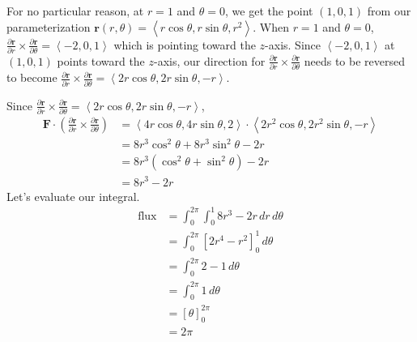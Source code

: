 \documentclass{article}
\newcommand{\lrp}[1]{\left( #1 \right)}
\newcommand{\lra}[1]{\left\langle #1 \right\rangle}
\newcommand{\lrb}[1]{\left[ #1 \right]}
\renewcommand{\r}[0]{\mathbf{r}}
\newcommand{\F}[0]{\mathbf{F}}
\begin{document}
For no particular reason, at $r=1$ and $\theta =0$, we get the point $(1,0,1)$ from our parameterization $\r(r,\theta)=\lra{r\cos\theta, r\sin\theta, r^2}$. When $r=1$ and $\theta=0$, $\displaystyle \frac{\partial \r}{\partial r}\times  \frac{\partial \r }{\partial \theta}=\lra{-2,0,1}$ which is pointing toward the $z$-axis. Since $\lra{-2,0,1}$ at $(1,0,1)$ points toward the $z$-axis, our direction for $\displaystyle \frac{\partial \r}{\partial r}\times  \frac{\partial \r }{\partial \theta}$ needs to be reversed to become $\displaystyle \frac{\partial \r}{\partial r}\times  \frac{\partial \r }{\partial \theta}=\lra{2r\cos\theta, 2r\sin\theta, -r}$.
\begin{center}
\end{center}
Since $\displaystyle \frac{\partial \r}{\partial r}\times  \frac{\partial \r }{\partial \theta}=\lra{2r\cos\theta, 2r\sin\theta, -r}$,
     \begin{align*}
     \F\cdot \lrp{ \frac{\partial \r}{\partial r}\times \frac{\partial \r}{\partial \theta}}&=\lra{4r\cos\theta, 4r\sin\theta, 2}\cdot\lra{2r^2\cos\theta,2r^2\sin\theta, -r}\\
     &=8r^3\cos^2\theta+ 8r^3\sin^2 \theta-2r\\
     &=8r^3\lrp{\cos^2\theta+\sin^2\theta}-2r\\
     &=8r^3-2r\tag{$\cos^2\theta+\sin^2\theta=1$}
\end{align*}
Let's evaluate our integral.
\begin{align*}
   \text{flux} &=\int_0^{2\pi}\int_0^1 8r^3-2r\,dr\,d\theta\\
    &=\int_0^{2\pi}\lrb{2r^4-r^2}_0^1\,d\theta\\
    &=\int_0^{2\pi} 2 - 1\,d\theta\\
    &=\int_0^{2\pi} 1\,d\theta\\
    &=\lrb{\theta}_0^{2\pi}\\
    &=\boxed{2\pi}
\end{align*}
\end{document}
